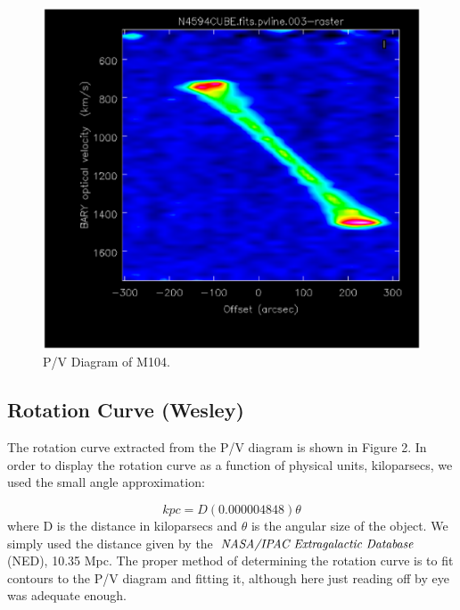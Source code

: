 \documentclass[12pt]{article}
\begin{document}
\begin{figure}
\includegraphics[scale=0.4]{PVdiagram.eps}
\caption{P/V Diagram of M104.}
\end{figure}

\subsection{Rotation Curve (Wesley)}

The rotation curve extracted from the P/V diagram is shown in Figure
2. In order to display the rotation curve as a function of physical
units, kiloparsecs, we used the small angle approximation:

\begin{equation}
kpc = D(0.000004848)\theta
\end{equation}
where D is the distance in kiloparsecs and $\theta$ is the angular size
of the object. We simply used the distance given by the $\emph{NASA/IPAC
Extragalactic Database}$ (NED), 10.35 Mpc. The proper method of
determining the rotation curve is to fit contours to the P/V diagram
and fitting it, although here just reading off by eye was adequate enough.
\end{document}
